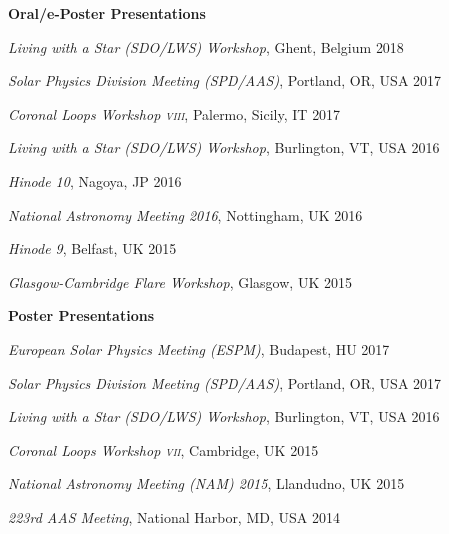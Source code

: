 \documentclass[11pt]{article}
\newcommand{\makeheading}[2][]%
        {\hspace*{-\marginparsep minus \marginparwidth}%
         \begin{minipage}[t]{\textwidth+\marginparwidth+\marginparsep}%
             {\large \bfseries #2 \hfill #1}\\[-0.15\baselineskip]%
                 \rule{\columnwidth}{1pt}%
         \end{minipage}}
\renewcommand{\section}[1]{\pagebreak[3]%
    \vspace{1.3\baselineskip}%
    \phantomsection\addcontentsline{toc}{section}{#1}%
    \noindent\llap{\scshape\smash{\parbox[t]{\marginparwidth}{\hyphenpenalty=10000\raggedright #1}}}%
    \vspace{-\baselineskip}\par}
\newcommand{\halfblankline}{\quad\vspace{-0.5\baselineskip}\pagebreak[3]}
\begin{document}
\halfblankline

\textbf{Oral/e-Poster Presentations}
\begin{innerlist}
     \item[] \textit{Living with a Star (SDO/LWS) Workshop}, Ghent, Belgium \hfill {2018} %
     \item[] \textit{Solar Physics Division Meeting (SPD/AAS)}, Portland, OR, USA \hfill {2017} %
     \item[] \textit{Coronal Loops Workshop \textsc{viii}}, Palermo, Sicily, IT \hfill {2017} %
     \item[] \textit{Living with a Star (SDO/LWS) Workshop}, Burlington, VT, USA \hfill {2016} %
     \item[] \textit{Hinode 10}, Nagoya, JP \hfill {2016} %
     \item[] \textit{National Astronomy Meeting 2016}, Nottingham, UK \hfill {2016} %
     \item[] \textit{Hinode 9}, Belfast, UK \hfill {2015} %
%
%
%
     \item[] \textit{Glasgow-Cambridge Flare Workshop}, Glasgow, UK \hfill {2015} %
\end{innerlist}

\halfblankline

\textbf{Poster Presentations}
\begin{innerlist}
     \item[] \textit{European Solar Physics Meeting (ESPM)}, Budapest, HU \hfill {2017}
     \item[] \textit{Solar Physics Division Meeting (SPD/AAS)}, Portland, OR, USA \hfill {2017} %
     \item[] \textit{Living with a Star (SDO/LWS) Workshop}, Burlington, VT, USA \hfill {2016} %
     \item[] \textit{Coronal Loops Workshop \textsc{vii}}, Cambridge, UK \hfill {2015} %
     \item[] \textit{National Astronomy Meeting (NAM) 2015}, Llandudno, UK \hfill {2015} %
     \item[] \textit{223rd AAS Meeting}, National Harbor, MD, USA \hfill {2014} %
\end{innerlist}
\end{document}
